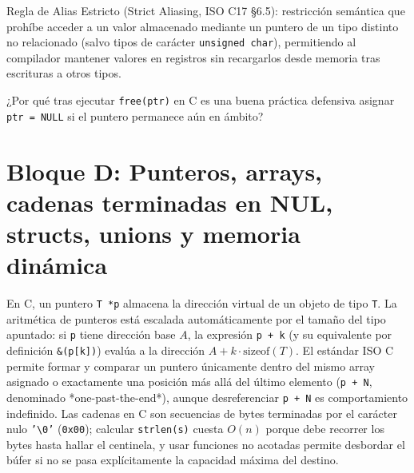 \documentclass{book}
\begin{document}
\begin{tcolorbox}[title={Definición}, studiumdef, breakable]

Regla de Alias Estricto (Strict Aliasing, ISO C17 §6.5): restricción semántica que prohíbe acceder a un valor almacenado mediante un puntero de un tipo distinto no relacionado (salvo tipos de carácter \texttt{unsigned char}), permitiendo al compilador mantener valores en registros sin recargarlos desde memoria tras escrituras a otros tipos.
\end{tcolorbox}

\begin{tcolorbox}[title={Autoficha}, studiumcheck, breakable]

¿Por qué tras ejecutar \texttt{free(ptr)} en C es una buena práctica defensiva asignar \texttt{ptr = NULL} si el puntero permanece aún en ámbito?
\end{tcolorbox}

\section{Bloque D: Punteros, arrays, cadenas terminadas en NUL, structs, unions y memoria dinámica}

En C, un puntero \texttt{T *p} almacena la dirección virtual de un objeto de tipo \texttt{T}. La aritmética de punteros está escalada automáticamente por el tamaño del tipo apuntado: si \texttt{p} tiene dirección base \(A\), la expresión \texttt{p + k} (y su equivalente por definición \texttt{\&(p[k])}) evalúa a la dirección \(A + k \cdot \text{sizeof}(T)\). El estándar ISO C permite formar y comparar un puntero únicamente dentro del mismo array asignado o exactamente una posición más allá del último elemento (\texttt{p + N}, denominado *one-past-the-end*), aunque desreferenciar \texttt{p + N} es comportamiento indefinido. Las cadenas en C son secuencias de bytes terminadas por el carácter nulo \texttt{'\textbackslash{}0'} (\texttt{0x00}); calcular \texttt{strlen(s)} cuesta \(O(n)\) porque debe recorrer los bytes hasta hallar el centinela, y usar funciones no acotadas permite desbordar el búfer si no se pasa explícitamente la capacidad máxima del destino.
\end{document}
